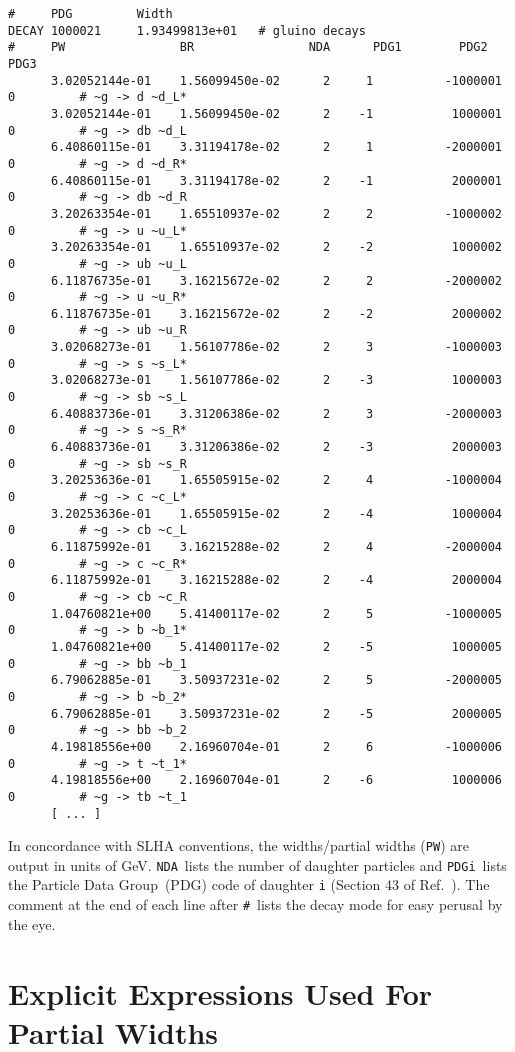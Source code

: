 \documentclass[final,3p,times,pdflatex]{elsarticle}
\def\code#1{{\tt #1}}
\begin{document}
{\small
\begin{verbatim}
#     PDG         Width             
DECAY 1000021     1.93499813e+01   # gluino decays
#     PW                BR                NDA      PDG1        PDG2        PDG3       
      3.02052144e-01    1.56099450e-02      2     1          -1000001     0         # ~g -> d ~d_L*
      3.02052144e-01    1.56099450e-02      2    -1           1000001     0         # ~g -> db ~d_L
      6.40860115e-01    3.31194178e-02      2     1          -2000001     0         # ~g -> d ~d_R*
      6.40860115e-01    3.31194178e-02      2    -1           2000001     0         # ~g -> db ~d_R
      3.20263354e-01    1.65510937e-02      2     2          -1000002     0         # ~g -> u ~u_L*
      3.20263354e-01    1.65510937e-02      2    -2           1000002     0         # ~g -> ub ~u_L
      6.11876735e-01    3.16215672e-02      2     2          -2000002     0         # ~g -> u ~u_R*
      6.11876735e-01    3.16215672e-02      2    -2           2000002     0         # ~g -> ub ~u_R
      3.02068273e-01    1.56107786e-02      2     3          -1000003     0         # ~g -> s ~s_L*
      3.02068273e-01    1.56107786e-02      2    -3           1000003     0         # ~g -> sb ~s_L
      6.40883736e-01    3.31206386e-02      2     3          -2000003     0         # ~g -> s ~s_R*
      6.40883736e-01    3.31206386e-02      2    -3           2000003     0         # ~g -> sb ~s_R
      3.20253636e-01    1.65505915e-02      2     4          -1000004     0         # ~g -> c ~c_L*
      3.20253636e-01    1.65505915e-02      2    -4           1000004     0         # ~g -> cb ~c_L
      6.11875992e-01    3.16215288e-02      2     4          -2000004     0         # ~g -> c ~c_R*
      6.11875992e-01    3.16215288e-02      2    -4           2000004     0         # ~g -> cb ~c_R
      1.04760821e+00    5.41400117e-02      2     5          -1000005     0         # ~g -> b ~b_1*
      1.04760821e+00    5.41400117e-02      2    -5           1000005     0         # ~g -> bb ~b_1
      6.79062885e-01    3.50937231e-02      2     5          -2000005     0         # ~g -> b ~b_2*
      6.79062885e-01    3.50937231e-02      2    -5           2000005     0         # ~g -> bb ~b_2
      4.19818556e+00    2.16960704e-01      2     6          -1000006     0         # ~g -> t ~t_1*
      4.19818556e+00    2.16960704e-01      2    -6           1000006     0         # ~g -> tb ~t_1
      [ ... ]
\end{verbatim}}
In concordance with SLHA conventions, the widths/partial widths
(\code{PW}) are output 
in units 
of GeV. \code{NDA}~lists the number of daughter particles and
\code{PDGi}~lists the
Particle Data Group~(PDG) code of daughter \code{i} (Section 43 of
Ref.~\cite{Olive:2016xmw}). 
The comment at the end of each line after \code{\#}~lists the decay
mode for easy perusal by the eye.
\section{Explicit Expressions Used For Partial Widths}





\end{document}
